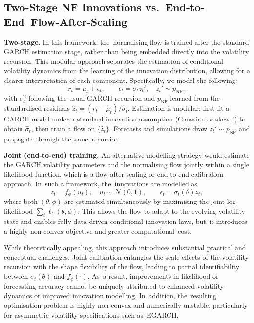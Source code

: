 \documentclass[risks,article,accept,pdftex,moreauthors]{Definitions/mdpi}
\begin{document}
\subsection{Two-Stage NF Innovations vs.\ End-to-End~Flow-After-Scaling}
\label{sec:nf-contrast}
\textbf{Two-stage.} In this framework, the~normalising flow is trained after the standard GARCH estimation stage, rather than being embedded directly into the volatility recursion. This modular approach separates the estimation of conditional volatility dynamics from the learning of the innovation distribution, allowing for a clearer interpretation of each component. Specifically, we model the following:
\[
r_t=\mu_t+\epsilon_t,\qquad \epsilon_t=\sigma_t z_t', \quad z_t' \sim p_{\text{NF}},
\]
with $\sigma_t^2$ following the usual GARCH recursion and $p_{\text{NF}}$ learned from the standardised residuals $\hat z_t=(r_t-\hat\mu_t)/\hat\sigma_t$. Estimation is modular: first fit a GARCH model under a standard innovation assumption (Gaussian or skew-$t$) to obtain 
$\hat\sigma_t$, then train a flow on $\{\hat z_t\}$. 
Forecasts and simulations draw $z_t' \sim p_{\text{NF}}$ 
and propagate through the same~recursion.

\textbf{Joint (end-to-end) training.} 
An alternative modelling strategy would estimate the GARCH volatility parameters and the normalising flow jointly within a single likelihood function, which is a flow-after-scaling or end-to-end calibration approach. In~such a framework, the~innovations are modelled as
\[
z_t = f_\phi(u_t), \quad u_t \sim \mathcal{N}(0,1), \qquad 
\epsilon_t = \sigma_t(\theta) z_t,
\]
where both $(\theta, \phi)$ are estimated simultaneously by maximising 
the joint log-likelihood 
$\sum_t \ell_t(\theta, \phi)$. 
This allows the flow to adapt to the evolving volatility state 
and enables fully data-driven conditional innovation laws,  but~it introduces a highly non-convex objective and greater computational~cost.

While theoretically appealing, this approach introduces substantial practical and conceptual challenges. Joint calibration entangles the scale effects of the volatility recursion with the shape flexibility of the flow, leading to partial identifiability between $\sigma_t(\theta)$ and $f_\phi(\cdot)$. As~a result, improvements in likelihood or forecasting accuracy cannot be uniquely attributed to enhanced volatility dynamics or improved innovation modelling. In~addition, the~resulting optimisation problem is highly non-convex and numerically unstable, particularly for asymmetric volatility specifications such as~EGARCH.
\end{document}
